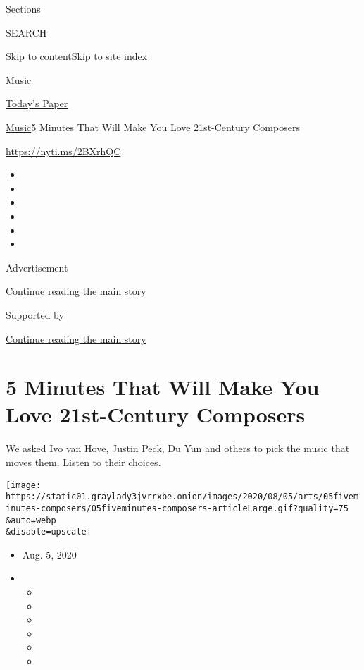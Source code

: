Sections

SEARCH

\protect\hyperlink{site-content}{Skip to
content}\protect\hyperlink{site-index}{Skip to site index}

\href{https://www.nytimes3xbfgragh.onion/section/arts/music}{Music}

\href{https://myaccount.nytimes3xbfgragh.onion/auth/login?response_type=cookie\&client_id=vi}{}

\href{https://www.nytimes3xbfgragh.onion/section/todayspaper}{Today's
Paper}

\href{/section/arts/music}{Music}\textbar{}5 Minutes That Will Make You
Love 21st-Century Composers

\url{https://nyti.ms/2BXrhQC}

\begin{itemize}
\item
\item
\item
\item
\item
\item
\end{itemize}

Advertisement

\protect\hyperlink{after-top}{Continue reading the main story}

Supported by

\protect\hyperlink{after-sponsor}{Continue reading the main story}

\hypertarget{5-minutes-that-will-make-you-love-21st-century-composers}{%
\section{5 Minutes That Will Make You Love 21st-Century
Composers}\label{5-minutes-that-will-make-you-love-21st-century-composers}}

We asked Ivo van Hove, Justin Peck, Du Yun and others to pick the music
that moves them. Listen to their choices.

\texttt{[image: https://static01.graylady3jvrrxbe.onion/images/2020/08/05/arts/05fiveminutes-composers/05fiveminutes-composers-articleLarge.gif?quality=75\\\&auto=webp\\\&disable=upscale]}

\begin{itemize}
\item
  Aug. 5, 2020
\item
  \begin{itemize}
  \item
  \item
  \item
  \item
  \item
  \item
  \end{itemize}
\end{itemize}

